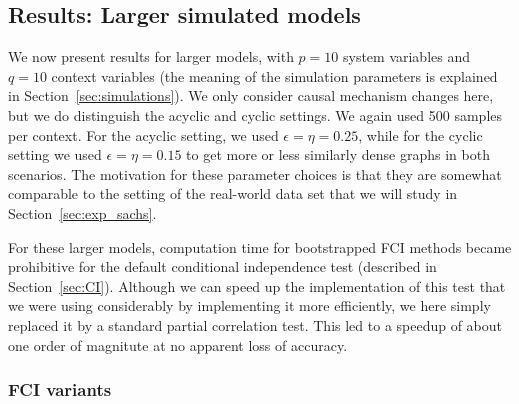 \documentclass[twoside,11pt]{article}
\begin{document}

\subsection{Results: Larger simulated models}

We now present results for larger models, with $p=10$ system variables and $q=10$ context variables
(the meaning of the simulation parameters is explained in Section~\ref{sec:simulations}).
We only consider causal mechanism changes here, but we do distinguish the acyclic and cyclic settings.
We again used 500 samples per context. For the acyclic setting, we used $\epsilon=\eta=0.25$, while for
the cyclic setting we used $\epsilon=\eta=0.15$ to get more or less similarly dense graphs in both scenarios.
The motivation for these parameter choices is that they are somewhat comparable to the setting of the real-world data set that we will study in Section~\ref{sec:exp_sachs}.

For these larger models, computation time for bootstrapped FCI methods became prohibitive for the default conditional
independence test (described in Section~\ref{sec:CI}). 
Although we can speed up the implementation of this test that we were using considerably by implementing it 
more efficiently, we here simply replaced it by a standard partial correlation test. This
led to a speedup of about one order of magnitute at no apparent loss of accuracy.

\subsubsection{FCI variants}
\end{document}
